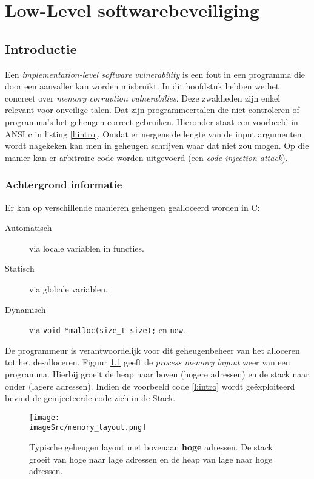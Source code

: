 \documentclass[../main.tex]{subfiles}
\begin{document}
\chapter{Low-Level softwarebeveiliging}
\section{Introductie}
Een \emph{implementation-level software vulnerability} is een fout in een programma die door een aanvaller kan worden misbruikt.
In dit hoofdstuk hebben we het concreet over \emph{memory corruption vulnerabilies}.
Deze zwakheden zijn enkel relevant voor onveilige talen.
Dat zijn programmeertalen die niet controleren of programma's het geheugen correct gebruiken.
Hieronder staat een voorbeeld in ANSI c in listing \ref{l:intro}. Omdat er nergens de lengte van de input argumenten wordt nagekeken kan men in geheugen schrijven waar dat niet zou mogen.
Op die manier kan er arbitraire code worden uitgevoerd (een \emph{code injection attack}).
 


\subsection{Achtergrond informatie}
Er kan op verschillende manieren geheugen gealloceerd worden in C:
\begin{description}
	\item[Automatisch] via locale variablen in functies.	
	\item[Statisch] via globale variablen.	
	\item[Dynamisch] via \lstinline[style=cstyle]{void *malloc(size_t size);} en \lstinline[style=cstyle]{new}.
\end{description}
De programmeur is verantwoordelijk voor dit geheugenbeheer van het alloceren tot het de-alloceren.
Figuur \ref{f:mem_lay} geeft de \emph{process memory layout} weer van een programma.
Hierbij groeit de heap naar boven (hogere adressen) en de stack naar onder (lagere adressen).
Indien de voorbeeld code \ref{l:intro} wordt ge\"exploiteerd bevind de geinjecteerde code zich in de Stack.
\begin{figure}
\centering
\texttt{[image: \\imageSrc/memory\_layout.png]}
\caption{Typische geheugen layout met bovenaan \textbf{hoge} adressen. De stack groeit van hoge naar lage adressen en de heap van lage naar hoge adressen.}
\label{f:mem_lay}
\end{figure}
\end{document}

